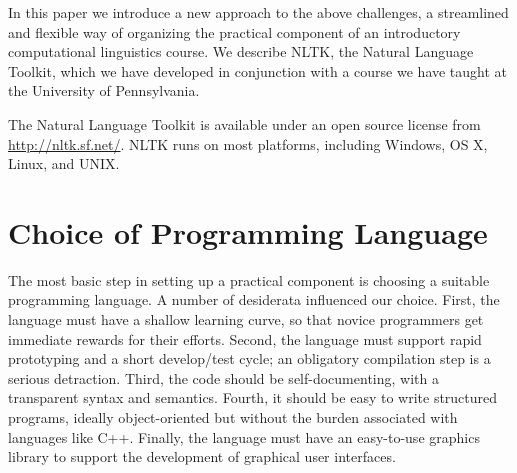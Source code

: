 \documentclass[11pt]{article}
\begin{document}
In this paper we introduce a new approach to the above challenges, a
streamlined and flexible way of organizing the practical component of
an introductory computational linguistics course.  We describe NLTK,
the Natural Language Toolkit, which we have developed in conjunction
with a course we have taught at the University of Pennsylvania.


The Natural Language Toolkit is available under an open source license
from \mbox{\url{http://nltk.sf.net/}}.  NLTK runs on most platforms, including
Windows, OS X, Linux, and UNIX.

\section{Choice of Programming Language}
\label{sec:python}

The most basic step in setting up a practical component is choosing a
suitable programming language.  A number of desiderata influenced our
choice.  First, the language must have a shallow learning curve, so
that novice programmers get immediate rewards for their efforts.
Second, the language must support rapid prototyping and a short
develop/test cycle; an obligatory compilation step is a serious
detraction.  Third, the code should be self-documenting, with a
transparent syntax and semantics.  Fourth, it should be easy to write
structured programs, ideally object-oriented but without the burden
associated with languages like C++.  Finally, the language must have
an easy-to-use graphics library to support the development of
graphical user interfaces.
\end{document}
